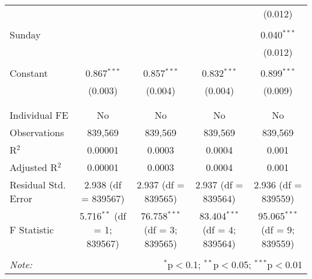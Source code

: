 \documentclass[
]{article}
\begin{document}
\begin{table}[!htbp]
{\begin{tabular}{@{\extracolsep{5pt}}lcccc}
  &  &  &  & (0.012) \\ 
  & & & & \\ 
 Sunday &  &  &  & 0.040$^{***}$ \\ 
  &  &  &  & (0.012) \\ 
  & & & & \\ 
 Constant & 0.867$^{***}$ & 0.857$^{***}$ & 0.832$^{***}$ & 0.899$^{***}$ \\ 
  & (0.003) & (0.004) & (0.004) & (0.009) \\ 
  & & & & \\ 
\hline \\[-1.8ex] 
Individual FE & No & No & No & No \\ 
Observations & 839,569 & 839,569 & 839,569 & 839,569 \\ 
R$^{2}$ & 0.00001 & 0.0003 & 0.0004 & 0.001 \\ 
Adjusted R$^{2}$ & 0.00001 & 0.0003 & 0.0004 & 0.001 \\ 
Residual Std. Error & 2.938 (df = 839567) & 2.937 (df = 839565) & 2.937 (df = 839564) & 2.936 (df = 839559) \\ 
F Statistic & 5.716$^{**}$ (df = 1; 839567) & 76.758$^{***}$ (df = 3; 839565) & 83.404$^{***}$ (df = 4; 839564) & 95.065$^{***}$ (df = 9; 839559) \\ 
\hline 
\hline \\[-1.8ex] 
\textit{Note:}  & \multicolumn{4}{r}{$^{*}$p$<$0.1; $^{**}$p$<$0.05; $^{***}$p$<$0.01} \\ 
\end{tabular}
} 
\end{table} 
\newpage
\end{document}
